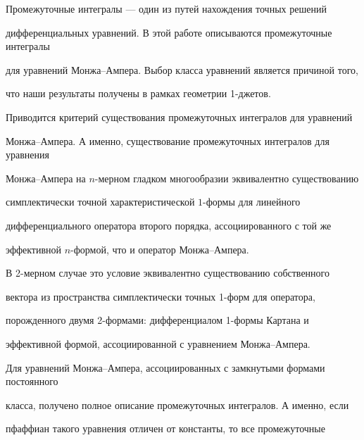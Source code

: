 

\pagestyle{plain} %







\maketitle


\label{begin}





Промежуточные интегралы --- один из путей нахождения точных решений 


дифференциальных уравнений. В этой работе описываются промежуточные интегралы


для уравнений Монжа--Ампера. Выбор класса уравнений является причиной того,


что наши результаты получены в рамках геометрии 1-джетов.


Приводится критерий существования промежуточных интегралов для уравнений 


Монжа--Ампера. А именно, существование промежуточных интегралов для уравнения 


Монжа--Ампера на $n$-мерном гладком многообразии эквивалентно существованию 


симплектически точной характеристической $1$-формы для линейного 


дифференциального оператора второго порядка, ассоциированного с той же 


эффективной $n$-формой, что и оператор Монжа--Ампера. 


В 2-мерном случае это условие эквивалентно существованию собственного 


вектора из пространства симплектически точных 1-форм для оператора, 


порожденного двумя 2-формами: дифференциалом 1-формы Картана и 


эффективной формой, ассоциированной с уравнением Монжа--Ампера. 


Для уравнений Монжа--Ампера, ассоциированных с замкнутыми формами постоянного


класса, получено полное описание промежуточных интегралов. А именно, если 


пфаффиан такого уравнения отличен от константы, то все промежуточные 


